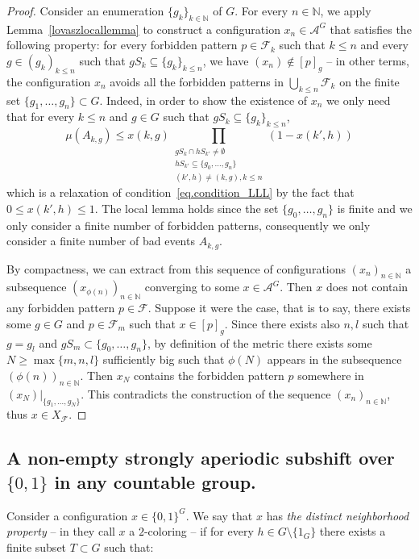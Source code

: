 \documentclass[letterpaper]{article}
\theoremstyle{plain}
\def\NN{\mathbb{N}}
\def\ag{\mathcal{A}}
\def\FF{\mathcal{F}}
\newcommand{\define}[1]{\emph{#1}}
\newcommand{\cor}[2][]{#2}
\begin{document}
	\begin{proof}
		Consider an enumeration $\{g_k\}_{k\in\NN}$ of $G$. For every $n\in\NN$, we apply Lemma~\ref{lovaszlocallemma} to construct a configuration $x_n\in\ag^G$ that satisfies the following property: for every forbidden pattern $p \in \FF_k$ such that $k \leq n$ and every $g \in (g_k)_{k\leq n}$ such that $gS_k\subseteq \{g_k\}_{k\leq n}$, we have $(x_n) \notin [p]_g$ -- in other terms, the configuration $x_n$ avoids all the forbidden patterns in $\bigcup_{k \leq n}\FF_k$ on the finite set $\{g_1,\dots,g_n\}\subset G$. Indeed, in order to show the existence of $x_n$ we only need that for every $k \leq n$ and $g \in G$ such that $gS_k\subseteq \{g_k\}_{k\leq n}$,
		$$ \mu(A_{k,g})\leq x(k,g)\prod_{\substack{gS_k\cap hS_{k'}\neq\emptyset\\ hS_{k'}\subseteq \{g_0,\dots,g_n\} \\ (k',h) \neq (k,g), k \leq n}   }(1-x(k',h))$$
		which is a relaxation of condition~\eqref{eq.condition_LLL} by the fact that $0\leq x(k',h)\leq 1$. The local lemma holds since the set $\{g_0,\dots,g_n\}$ is finite and we only consider a finite number of forbidden patterns, consequently we only consider a finite number of bad events $A_{k,g}$.
		
		By compactness, we can extract from this sequence of configurations $(x_n)_{n\in\NN}$ a subsequence $(x_{\phi(n)})_{n\in\NN}$ converging to some $x \in \ag^G$. Then $x$ does not contain any forbidden pattern $p \in \FF$. Suppose it were the case, that is to say, there exists some $g\in G$ and $p \in \FF_m$ such that $x \in [p]_g$. Since there exists also $n,l$ such that $g = g_l$ and $gS_m\subset\{g_0,\dots,g_n\}$, by definition of the metric there exists some $N \geq \max\{m,n,l\}$ sufficiently big \cor[which with this property that]{such that $\phi(N)$} appears in the subsequence $(\phi(n))_{n\in\NN}$. Then $x_N$ contains the forbidden pattern $p$ somewhere in $(x_N)|_{\{g_1,\dots,g_N\}}$. This contradicts the construction of the sequence $(x_n)_{n\in\NN}$, thus $x \in X_{\FF}$.
	\end{proof}
	
	\subsection{A non-empty strongly aperiodic subshift over $\{0,1\}$ in any countable group.}
	\label{subsection.simpler_proof}
	
	Consider a configuration $x \in \{0,1\}^G$. We say that $x$ has \define{the distinct neighborhood property} -- in \cite{gao2009} they call $x$ a $2$-coloring -- if for every $h \in G \setminus \{1_G\}$ there exists a finite subset $T \subset G$ such that:
	
\end{document}
